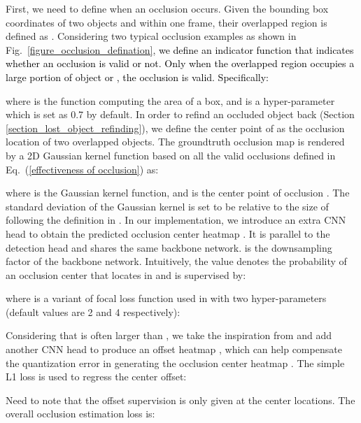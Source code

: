 \documentclass[final,1p,times,twocolumn]{elsarticle}
\newcommand{\eref}[1]{Eq.~(\ref{#1})}
\newcommand{\fref}[1]{Fig.~\ref{#1}}
\newcommand{\qiankun}[1]{\textcolor{black}{#1}}
\begin{document}
	First, we need to define when an occlusion occurs. Given the bounding box coordinates of two objects  and  within one frame, their overlapped region is defined as .
	Considering two typical occlusion examples as shown in \fref{figure_occlusion_defination}, 
	\qiankun{we define an indicator function  that indicates whether an occlusion is valid or not. Only when the overlapped region occupies a large portion of object  or , the occlusion  is valid. Specifically:}
	
	where  is the function computing the area of a box, and  is a hyper-parameter which is set as 0.7 by default. 
	In order to refind an occluded object back (Section \ref{section_lost_object_refinding}), we define the center point of  as the occlusion location of two overlapped objects. The groundtruth occlusion map  is rendered by a 2D Gaussian kernel function based on  all the valid occlusions defined in \eref{effectiveness of occlusion} as:
	
	where  is the Gaussian kernel function, and  is the center point of occlusion . The standard deviation  of the Gaussian kernel is set to be relative to the size of  following the definition in \cite{law2018cornernet}. In our implementation, we introduce an extra CNN head to obtain the predicted occlusion center heatmap . It is parallel to the detection head and shares the same backbone network.  is the downsampling factor of the backbone network. Intuitively, the value  denotes the probability of an occlusion center that locates in  and is supervised by:
	
	where  is a variant of focal loss function used in \cite{law2018cornernet} with two hyper-parameters  (default values are 2 and 4 respectively):
	
	
	
	Considering that  is often larger than , we take the inspiration from \cite{zhou2019objects} and add another CNN head to produce an offset heatmap , which  can help compensate the quantization error in generating the occlusion center heatmap . The simple L1 loss is used to regress the center offset:
	
	Need to note that the offset supervision is only given at the center locations. The overall occlusion estimation loss is:
	
	
	
\end{document}
